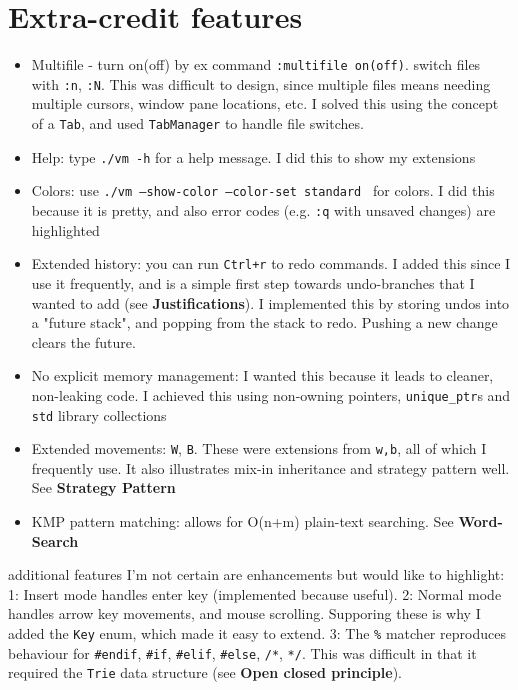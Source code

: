 \documentclass{article}
\newenvironment{myitemize}
{ \begin{itemize}
    \setlength{\itemsep}{2pt}
    \setlength{\parskip}{0pt}
    \setlength{\parsep}{0pt}     }
{ \end{itemize}                  }
\begin{document}
\section{Extra-credit features}
\begin{myitemize}
  \item{Multifile - turn on(off) by ex command \texttt{:multifile on(off)}. 
    switch files with \texttt{:n}, \texttt{:N}. 
  This was difficult to design, since multiple files means 
  needing multiple cursors, window pane locations, etc. 
  I solved this using the concept of a \texttt{Tab}, 
and used \texttt{TabManager} to handle file switches. }
  \item{Help: type \texttt{./vm -h} for a help message. 
    I did this to show my extensions }
  \item{Colors: use \texttt{./vm --show-color --color-set standard } for colors. 
    I did this because it is pretty, and also error codes 
  (e.g. \texttt{:q} with unsaved changes) are highlighted}
  \item{Extended history: you can run \texttt{Ctrl+r} to redo commands. 
  I added this since I use it frequently, and is a simple first step towards undo-branches
   that I wanted to add (see \textbf{Justifications}). 
  I implemented this by storing undos into a "future stack", 
  and popping from the stack to redo. Pushing a new change clears the future. }
  \item{No explicit memory management: 
      I wanted this because it leads to cleaner, non-leaking code. 
    I achieved this using non-owning pointers, \texttt{unique\_ptr}s 
  and \texttt{std} library collections }
  \item{Extended movements: \texttt{W}, \texttt{B}. 
      These were extensions from \texttt{w,b}, 
      all of which I frequently use. 
    It also illustrates mix-in inheritance and strategy pattern well.
  See \textbf{Strategy Pattern}}
  \item{KMP pattern matching: allows for O(n+m) 
    plain-text searching. See \textbf{Word-Search}}
\end{myitemize}
3 additional features I'm not certain are enhancements but would like to highlight: 
1: Insert mode handles enter key (implemented because useful). 
2: Normal mode handles arrow key movements, and mouse scrolling. 
Supporing these is why I added the \texttt{Key} enum, which made it easy to extend. 
3: The \texttt{\%} matcher reproduces behaviour for \texttt{\#endif}, \texttt{\#if}, 
\texttt{\#elif}, \texttt{\#else}, \texttt{/*}, \texttt{*/}. 
This was difficult in that it required the \texttt{Trie} data structure
(see \textbf{Open closed principle}). 
\end{document}
